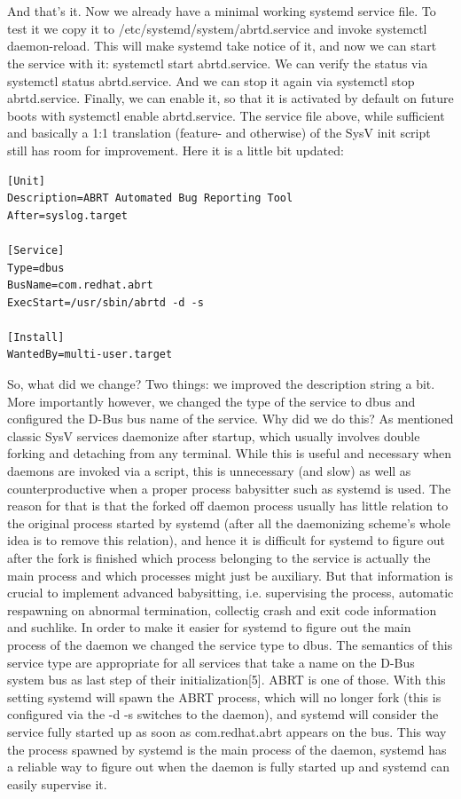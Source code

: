 \documentclass[titlepage]{article}
\begin{document}
\\
\\
And that's it. Now we already have a minimal working systemd service file. To test it we copy it to /etc/systemd/system/abrtd.service and invoke systemctl daemon-reload. This will make systemd take notice of it, and now we can start the service with it: systemctl start abrtd.service. We can verify the status via systemctl status abrtd.service. And we can stop it again via systemctl stop abrtd.service. Finally, we can enable it, so that it is activated by default on future boots with systemctl enable abrtd.service.
\newpage
The service file above, while sufficient and basically a 1:1 translation (feature- and otherwise) of the SysV init script still has room for improvement. Here it is a little bit updated:
\begin{lstlisting}
[Unit]
Description=ABRT Automated Bug Reporting Tool
After=syslog.target

[Service]
Type=dbus
BusName=com.redhat.abrt
ExecStart=/usr/sbin/abrtd -d -s

[Install]
WantedBy=multi-user.target
\end{lstlisting}
So, what did we change? Two things: we improved the description string a bit. More importantly however, we changed the type of the service to dbus and configured the D-Bus bus name of the service. Why did we do this? As mentioned classic SysV services daemonize after startup, which usually involves double forking and detaching from any terminal. While this is useful and necessary when daemons are invoked via a script, this is unnecessary (and slow) as well as counterproductive when a proper process babysitter such as systemd is used. The reason for that is that the forked off daemon process usually has little relation to the original process started by systemd (after all the daemonizing scheme's whole idea is to remove this relation), and hence it is difficult for systemd to figure out after the fork is finished which process belonging to the service is actually the main process and which processes might just be auxiliary. But that information is crucial to implement advanced babysitting, i.e. supervising the process, automatic respawning on abnormal termination, collectig crash and exit code information and suchlike. In order to make it easier for systemd to figure out the main process of the daemon we changed the service type to dbus. The semantics of this service type are appropriate for all services that take a name on the D-Bus system bus as last step of their initialization[5]. ABRT is one of those. With this setting systemd will spawn the ABRT process, which will no longer fork (this is configured via the -d -s switches to the daemon), and systemd will consider the service fully started up as soon as com.redhat.abrt appears on the bus. This way the process spawned by systemd is the main process of the daemon, systemd has a reliable way to figure out when the daemon is fully started up and systemd can easily supervise it.
\end{document}
